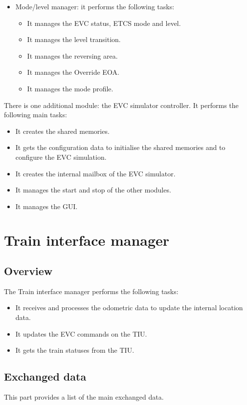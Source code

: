 \documentclass[nocc]{template/openetcs_report}
\begin{document}
\begin{itemize}
\begin{itemize}
	\end{itemize}
\item	Mode/level manager: it performs the following tasks:
	\begin{itemize}
	\item	It manages the EVC status, ETCS mode and level.
	\item	It manages the level transition.
	\item	It manages the reversing area.
	\item	It manages the Override EOA.
	\item	It manages the mode profile.
	\end{itemize}
\end{itemize}

There is one additional module: the EVC simulator controller. It performs the following main tasks:
\begin{itemize}
\item It creates the shared memories.
\item It gets the configuration data to initialise the shared memories and to configure the EVC simulation.
\item It creates the internal mailbox of the EVC simulator.
\item It manages the start and stop of the other modules.
\item It manages the GUI.
\end{itemize}
\chapter{Train interface manager}
\section{Overview}
The Train interface manager performs the following tasks:
\begin{itemize}
\item	It receives and processes the odometric data to update the internal location data.
\item	It updates the EVC commands on the TIU.
\item	It gets the train statuses from the TIU.
\end{itemize}
\section{Exchanged data}
This part provides a list of the main exchanged data. 
\end{document}
